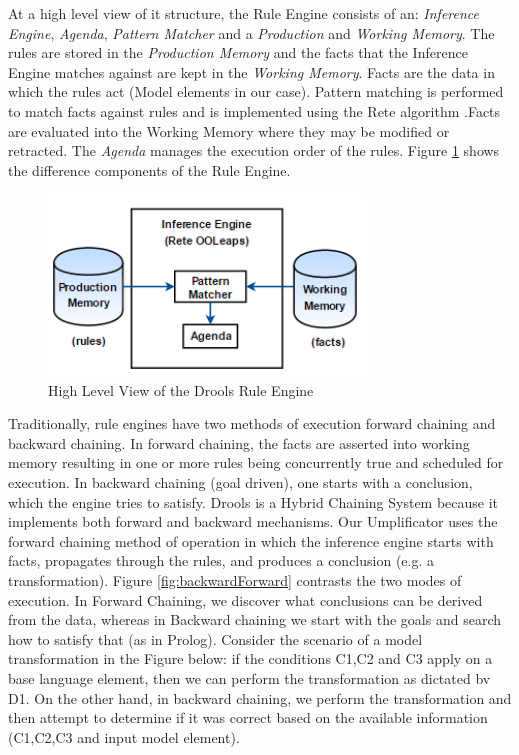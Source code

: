 At a high level view of it structure, the Rule Engine consists of an: \textit{Inference Engine}, \textit{Agenda}, \textit{Pattern Matcher} and a \textit{Production} and \textit{Working Memory}. 
The rules are stored in the \textit{Production Memory} and the facts that the Inference Engine matches against are kept in the \textit{Working Memory}.
Facts are the data in which the rules act (Model elements in our case).
Pattern matching is performed to match facts against rules and is implemented using the Rete algorithm \cite{reteDROOLS}.Facts are evaluated into the Working Memory where they may be modified or retracted. The \textit{Agenda} manages the execution order of the rules. Figure \ref{fig:RuleEngineArchitecture} shows the difference components of the Rule Engine.

\begin{figure}[h]
\centering
\includegraphics[width=0.75\textwidth]{Figures/RuleEngineArchitecture.png}
\caption{High Level View of the Drools Rule Engine}
\label{fig:RuleEngineArchitecture}
\end{figure}

Traditionally, rule engines have two methods of execution \cite{RulebasedSystems} forward chaining and backward chaining. In forward chaining, the facts are asserted into working memory resulting in one or more rules being concurrently true and scheduled for execution. In backward chaining (goal driven), one starts with a conclusion, which the engine tries to satisfy. Drools is a Hybrid Chaining System because it implements both forward and backward mechanisms. Our Umplificator uses the forward chaining method of operation in which the inference engine starts with facts, propagates through the rules, and produces a conclusion (e.g. a transformation). Figure \ref{fig:backwardForward} contrasts the two modes of execution. In Forward Chaining, we discover what conclusions can be derived from the data, whereas in Backward chaining we start with the goals and search how to satisfy that (as in Prolog). Consider the scenario of a model transformation in the Figure below: if the conditions C1,C2 and C3 apply on a base language element, then we can perform the transformation as dictated bv D1. 
On the other hand, in backward chaining, we perform the transformation and then attempt to determine if it was correct based on the available information (C1,C2,C3 and input model element).

